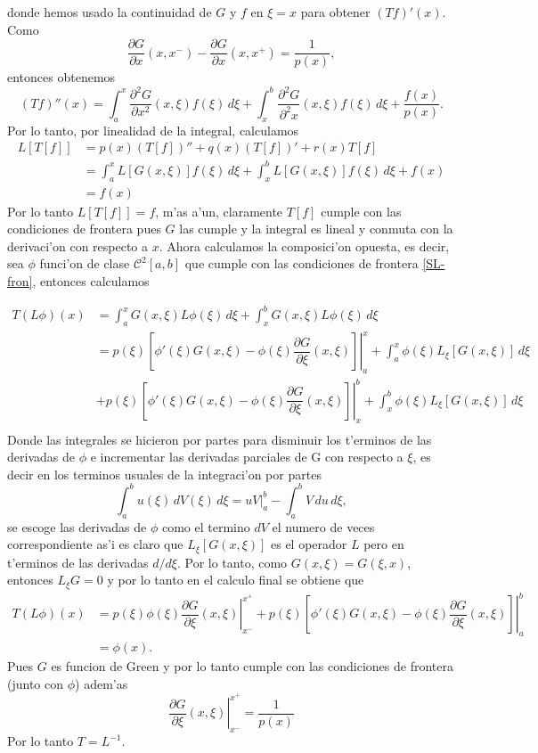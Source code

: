 \documentclass[main.tex]{subfiles}
\begin{document}
donde hemos usado la continuidad de $G$ y $f$ en $\xi = x$ para obtener $(T f)'(x)$. Como
\[
  \dfrac{\partial G}{\partial x}(x, x^{-}) - \dfrac{\partial G}{\partial x}(x, x^{+}) = \frac{1}{p(x)},
\]
entonces obtenemos
\[
  (T f)''(x) = \int_{a}^{x} \dfrac{\partial^{2}G}{\partial x^{2}}(x, \xi)f(\xi)\,d\xi + \int_{x}^{b}
  \dfrac{\partial^{2}G}{\partial^{2}x}(x, \xi)f(\xi)\,d\xi + \frac{f(x)}{p(x)}.
\]
Por lo tanto, por linealidad de la integral, calculamos
\begin{align*}
  L[T[f]]&=p(x)(T[f])''+q(x)(T[f])'+r(x)T[f]\\
         &=\int_{a}^{x} L[G(x,\xi)]f(\xi)\,d\xi + \int_{x}^{b} L[G(x,\xi)]f(\xi)\,d\xi+f(x)\\
         &=f(x)
\end{align*}
Por lo tanto $L[T[f]]=f$, m'as a'un, claramente $T[f]$ cumple con las condiciones de frontera pues $G$ las cumple y la integral es lineal y conmuta con la derivaci'on con respecto a $x$. Ahora calculamos la composici'on opuesta, es decir, sea $\phi$ funci'on de clase $\mathcal{C}^{2}[a,b]$ que cumple con las condiciones de frontera \ref{SL-fron}, entonces calculamos

\begin{align*}
T(L\phi)(x) &= \int_{a}^{x}G(x,\xi)L\phi(\xi)\,d\xi+\int_{x}^{b} G(x,\xi)L\phi(\xi)\,d\xi \\
            &=\left.p(\xi)\left[\phi'(\xi)G(x,\xi)-\phi(\xi)\dfrac{\partial G}{\partial\xi}(x,\xi)\right]\right|_{a}^{x}
            +\int_{a}^{x} \phi(\xi)L_{\xi}[G(x,\xi)]\,d\xi\\
            &+\left. p(\xi)\left[\phi'(\xi)G(x,\xi)-\phi(\xi) \dfrac{\partial G}{\partial\xi}(x,\xi)\right]
              \right|_{x}^{b}+\int_{x}^{b} \phi(\xi)L_{\xi}[G(x,\xi)]\,d\xi \\
\end{align*}
Donde las integrales se hicieron por partes para disminuir los t'erminos de las derivadas de $\phi$ e incrementar las derivadas parciales de G con respecto a $\xi$, es decir en los terminos usuales de la integraci'on por partes
\[
\int_{a}^{b}u(\xi)\,dV(\xi)\,d\xi=\left.uV\right|_{a}^{b}-\int_{a}^{b}V\,du\,d\xi,
\]
se escoge las derivadas de $\phi$ como el termino $dV$ el numero de veces correspondiente as'i es claro que $L_{\xi}[G(x,\xi)]$ es el operador $L$ pero en t'erminos de las derivadas $d/d\xi$. Por lo tanto, como $G(x,\xi)=G(\xi,x)$, entonces $L_{\xi}G=0$ y por lo tanto en el calculo final se obtiene que
\begin{align*}
  T(L\phi)(x)&=\left. p(\xi)\phi(\xi)\dfrac{\partial G}{\partial \xi}(x,\xi)\right|_{x^-}^{x^+}+
               \left. p(\xi)\left[\phi'(\xi)G(x,\xi)-\phi(\xi)\dfrac{\partial G}{\partial \xi}(x,\xi)\right]\right|_{a}^{b}\\
            &=\phi(x).
\end{align*}
Pues $G$ es funcion de Green y por lo tanto cumple con las condiciones de frontera (junto con $\phi$) adem'as
\[
  \left.\dfrac{\partial G}{\partial \xi}(x,\xi)\right|_{x^-}^{x^+}=\frac{1}{p(x)}
\]
Por lo tanto $T=L^{-1}$. \QED
\end{document}
